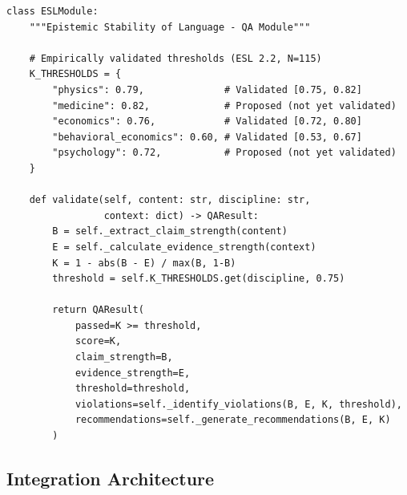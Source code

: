 \documentclass[11pt,a4paper]{article}
\begin{document}
\begin{lstlisting}[caption={ESL Module Interface}]
class ESLModule:
    """Epistemic Stability of Language - QA Module"""

    # Empirically validated thresholds (ESL 2.2, N=115)
    K_THRESHOLDS = {
        "physics": 0.79,              # Validated [0.75, 0.82]
        "medicine": 0.82,             # Proposed (not yet validated)
        "economics": 0.76,            # Validated [0.72, 0.80]
        "behavioral_economics": 0.60, # Validated [0.53, 0.67]
        "psychology": 0.72,           # Proposed (not yet validated)
    }

    def validate(self, content: str, discipline: str,
                 context: dict) -> QAResult:
        B = self._extract_claim_strength(content)
        E = self._calculate_evidence_strength(context)
        K = 1 - abs(B - E) / max(B, 1-B)
        threshold = self.K_THRESHOLDS.get(discipline, 0.75)

        return QAResult(
            passed=K >= threshold,
            score=K,
            claim_strength=B,
            evidence_strength=E,
            threshold=threshold,
            violations=self._identify_violations(B, E, K, threshold),
            recommendations=self._generate_recommendations(B, E, K)
        )
\end{lstlisting}

\subsection{Integration Architecture}
\end{document}
